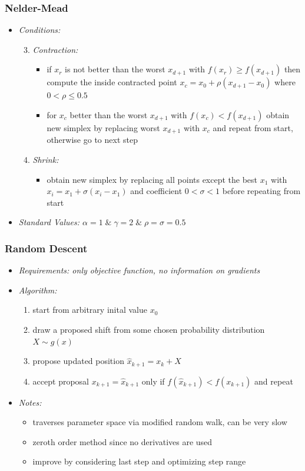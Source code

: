 	\begin{frame}[noframenumbering]
		\frametitle{Nelder-Mead}
		\begin{itemize}
			\item<2-> \itshape{Conditions:}
			\begin{enumerate}
				\setcounter{enumi}{2}
				\item<3-> \itshape{Contraction:}
				\begin{itemize}
					\item<4-> if $x_r$ is not better than the worst $x_{d+1}$ with $f(x_r) \geq f(x_{d+1})$ then compute the inside contracted point
							  $x_c = x_0 + \rho (x_{d+1} - x_0)$ where $0 < \rho \leq 0.5$
					\item<5-> for $x_c$ better than the worst $x_{d+1}$ with $f(x_c) < f(x_{d+1})$ obtain new simplex by replacing worst $x_{d+1}$
							  with $x_c$ and repeat from start, otherwise go to next step
				\end{itemize}
				\item<6-> \itshape{Shrink:}
				\begin{itemize}
					\item<7-> obtain new simplex by replacing all points except the best $x_1$ with $x_i = x_1 + \sigma(x_i - x_1)$ and
							  coefficient $0 < \sigma < 1$ before repeating from start
				\end{itemize}
			\end{enumerate}
			\item<8-> \itshape{Standard Values:} $\alpha = 1 \;\&\; \gamma = 2 \;\&\; \rho = \sigma = 0.5$
		\end{itemize}
	\end{frame}

	\begin{frame}
		\frametitle{Random Descent}
		\begin{itemize}
			\item<2-> \itshape{Requirements:} only objective function, no information on gradients
			\item<3-> \itshape{Algorithm:}
				\begin{enumerate}
					\item<4-> start from arbitrary inital value $x_0$
					\item<5-> draw a proposed shift from some chosen probability distribution $X \sim g(x)$
					\item<6-> propose updated position $\hat{x}_{k+1} = x_k + X$
					\item<7-> accept proposal $x_{k+1} = \hat{x}_{k+1}$ only if $f(\hat{x}_{k+1}) < f(x_{k+1})$ and repeat
				\end{enumerate}
			\item<8-> \itshape{Notes:}
				\begin{itemize}
					\item<9-> traverses parameter space via modified random walk, can be very slow
					\item<10-> zeroth order method since no derivatives are used
					\item<11-> improve by considering last step and optimizing step range
				\end{itemize}
		\end{itemize}
	\end{frame}

